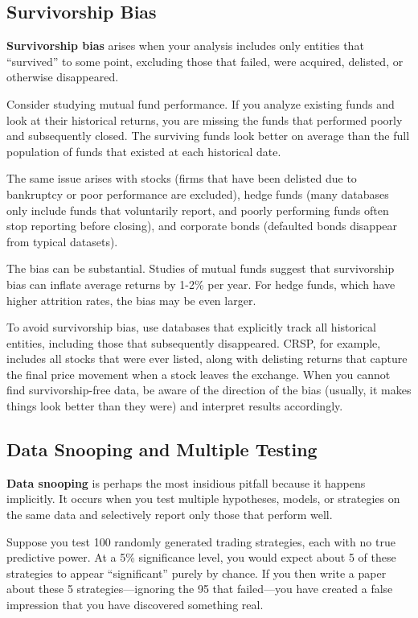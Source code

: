 \documentclass[11pt,a4paper]{article}
\newcommand{\keyword}[1]{\textbf{\textcolor{AccentOrange}{#1}}}
\begin{document}
\subsection{Survivorship Bias}

\keyword{Survivorship bias} arises when your analysis includes only entities that ``survived'' to some point, excluding those that failed, were acquired, delisted, or otherwise disappeared.

Consider studying mutual fund performance. If you analyze existing funds and look at their historical returns, you are missing the funds that performed poorly and subsequently closed. The surviving funds look better on average than the full population of funds that existed at each historical date.

The same issue arises with stocks (firms that have been delisted due to bankruptcy or poor performance are excluded), hedge funds (many databases only include funds that voluntarily report, and poorly performing funds often stop reporting before closing), and corporate bonds (defaulted bonds disappear from typical datasets).

The bias can be substantial. Studies of mutual funds suggest that survivorship bias can inflate average returns by 1-2\% per year. For hedge funds, which have higher attrition rates, the bias may be even larger.

To avoid survivorship bias, use databases that explicitly track all historical entities, including those that subsequently disappeared. CRSP, for example, includes all stocks that were ever listed, along with delisting returns that capture the final price movement when a stock leaves the exchange. When you cannot find survivorship-free data, be aware of the direction of the bias (usually, it makes things look better than they were) and interpret results accordingly.

\subsection{Data Snooping and Multiple Testing}

\keyword{Data snooping} is perhaps the most insidious pitfall because it happens implicitly. It occurs when you test multiple hypotheses, models, or strategies on the same data and selectively report only those that perform well.

Suppose you test 100 randomly generated trading strategies, each with no true predictive power. At a 5\% significance level, you would expect about 5 of these strategies to appear ``significant'' purely by chance. If you then write a paper about these 5 strategies---ignoring the 95 that failed---you have created a false impression that you have discovered something real.
\end{document}
